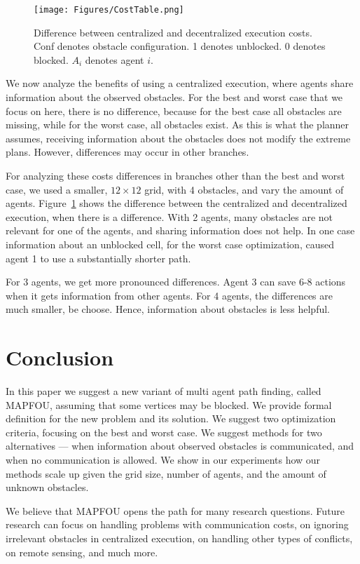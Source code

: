 \documentclass[letterpaper]{article} %
\begin{document}
\begin{figure}[t]
\centering
\texttt{[image: Figures/CostTable.png]}
      \caption{Difference between centralized and decentralized execution costs. Conf denotes obstacle configuration. 1 denotes unblocked. 0 denotes blocked. $A_i$ denotes agent $i$.}
      \label{fig:CostTable}
\end{figure}

We now analyze the benefits of using a centralized execution, where agents share information about the observed obstacles. For the best and worst case that we focus on here, there is no difference, because for the best case all obstacles are missing, while for the worst case, all obstacles exist. As this is what the planner assumes, receiving information about the obstacles does not modify the extreme plans. However, differences may occur in other branches.

For analyzing these costs differences in branches other than the best and worst case, we used a smaller, $12\times 12$ grid, with 4 obstacles, and vary the amount of agents. Figure~\ref{fig:CostTable} shows the difference between the centralized and decentralized execution, when there is a difference. With 2 agents, many obstacles are not relevant for one of the agents, and sharing information does not help. In one case  information about an unblocked cell, for the worst case optimization, caused agent 1 to use a substantially shorter path.

For 3 agents, we get more pronounced differences. Agent 3 can save 6-8 actions when it gets information from other agents. For 4 agents, the differences are much smaller, be  choose. Hence, information about obstacles is less helpful.


\section{Conclusion}

In this paper we suggest a new variant of multi agent path finding, called MAPFOU, assuming that some vertices may be blocked. We provide formal definition for the new problem and its solution. We suggest two optimization criteria, focusing on the best and worst case. We suggest methods for two alternatives --- when information about observed obstacles is communicated, and when no communication is allowed. We show in our experiments how our methods scale up given the grid size, number of agents, and the amount of unknown obstacles.

We believe that MAPFOU opens the path for many research questions. Future research can focus on handling problems with communication costs, on ignoring irrelevant obstacles in centralized execution, on handling other types of conflicts, on remote sensing, and much more.
\end{document}
